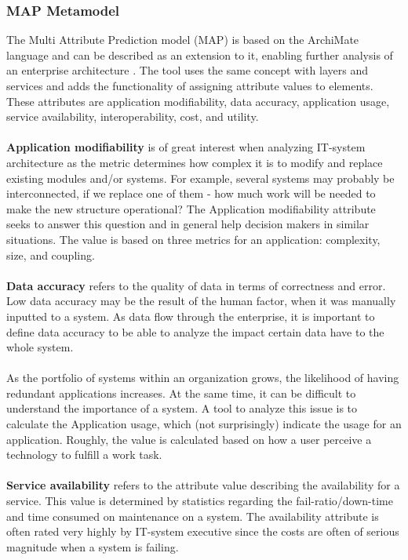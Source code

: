 \subsubsection{MAP Metamodel}
\label{sec:map_metamodel}
The Multi Attribute Prediction model (MAP) is based on the ArchiMate language and can be described as an extension to it, enabling further analysis of an enterprise architecture . The tool uses the same concept with layers and services and adds the functionality of assigning attribute values to elements. These attributes are application modifiability, data accuracy, application usage, service availability, interoperability, cost, and utility.\\\\
%
\textbf{Application modifiability} is of great interest when analyzing IT-system architecture as the metric determines how complex it is to modify and replace existing modules and/or systems. For example, several systems may probably be interconnected, if we replace one of them - how much work will be needed to make the new structure operational? The Application modifiability attribute seeks to answer this question and in general help decision makers in similar situations. The value is based on three metrics for an application: complexity, size, and coupling.\\\\
%
\textbf{Data accuracy} refers to the quality of data in terms of correctness and error. Low data accuracy may be the result of the human factor, when it was manually inputted to a system. As data flow through the enterprise, it is important to define data accuracy to be able to analyze the impact certain data have to the whole system.\\\\
%
As the portfolio of systems within an organization grows, the likelihood of having redundant applications increases. At the same time, it can be difficult to understand the importance of a system. A tool to analyze this issue is to calculate the Application usage, which (not surprisingly) indicate the usage for an application. Roughly, the value is calculated based on how a user perceive a technology to fulfill a work task.\\\\
%
\textbf{Service availability} refers to the attribute value describing the availability for a service. This value is determined by statistics regarding the fail-ratio/down-time and time consumed on maintenance on a system. The availability attribute is often rated very highly by IT-system executive since the costs are often of serious magnitude when a system is failing.\\\\
